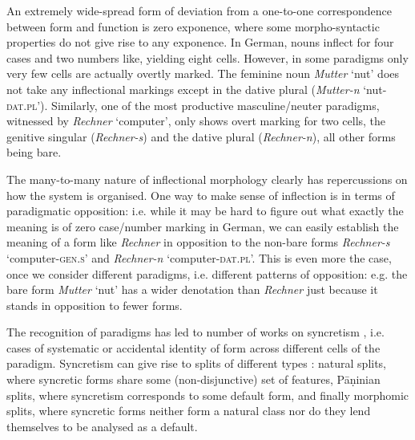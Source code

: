 An extremely wide-spread form of deviation from a one-to-one
correspondence between form and function is zero exponence, where some
morpho-syntactic properties do not give rise to any exponence. In
German, nouns inflect for four cases and two numbers like, yielding
eight cells. However, in some paradigms only very few cells are
actually overtly marked. The feminine noun \textit{Mutter} `nut' does
not take any inflectional markings except in the dative plural
(\textit{Mutter-n} `nut-\textsc{dat.pl}'). Similarly, one of the most
productive masculine/neuter paradigms, witnessed by \textit{Rechner}
`computer', only shows overt marking for two cells, the genitive
singular (\textit{Rechner-s}) and the dative plural
(\textit{Rechner-n}), all other forms being bare.



The many-to-many nature of inflectional morphology clearly has
repercussions on how the system is organised.  One way to make sense
of inflection is in terms of paradigmatic opposition: i.e. while it
may be hard to figure out what exactly the meaning is of zero
case/number marking in German, we can easily establish the meaning of
a form like \textit{Rechner} in opposition to the non-bare forms
\textit{Rechner-s} `computer-\textsc{gen.s}' and \textit{Rechner-n}
`computer-\textsc{dat.pl}'. This is even more the case, once we
consider different paradigms, i.e. different patterns of
opposition: e.g. the bare form \textit{Mutter} `nut' has a wider
denotation than \textit{Rechner} just because it stands in opposition
to fewer forms. 

The recognition of paradigms has led to number of works on syncretism
\citep[see, e.g.][]{Baerman05}, i.e. cases of systematic or accidental
identity of form across different cells of the paradigm. Syncretism
can give rise to splits of different types \citep{Corbett15}: natural splits, where
syncretic forms share some (non-disjunctive) set of features, Pāṇinian
splits, where syncretism corresponds to some default form, and finally
morphomic splits, where syncretic forms neither form a natural class
nor do they lend themselves to be analysed as a default. 

